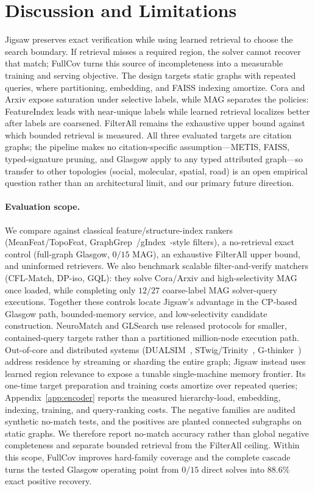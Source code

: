 \documentclass{article}
\begin{document}
\section{Discussion and Limitations}
\label{sec:limits}

Jigsaw preserves exact verification while using learned retrieval to choose the search boundary. If retrieval misses a required region, the solver cannot recover that match; FullCov turns this source of incompleteness into a measurable training and serving objective. The design targets static graphs with repeated queries, where partitioning, embedding, and FAISS indexing amortize. Cora and Arxiv expose saturation under selective labels, while MAG separates the policies: FeatureIndex leads with near-unique labels while learned retrieval localizes better after labels are coarsened. FilterAll remains the exhaustive upper bound against which bounded retrieval is measured. All three evaluated targets are citation graphs; the pipeline makes no citation-specific assumption---METIS, FAISS, typed-signature pruning, and Glasgow apply to any typed attributed graph---so transfer to other topologies (social, molecular, spatial, road) is an open empirical question rather than an architectural limit, and our primary future direction.

\paragraph{Evaluation scope.} We compare against classical feature/structure-index rankers (MeanFeat/TopoFeat, GraphGrep~\cite{ref_graphgrep}/gIndex~\cite{ref_gindex}-style filters), a no-retrieval exact control (full-graph Glasgow, $0/15$ MAG), an exhaustive FilterAll upper bound, and uninformed retrievers. We also benchmark scalable filter-and-verify matchers (CFL-Match, DP-iso, GQL): they solve Cora/Arxiv and high-selectivity MAG once loaded, while completing only $12/27$ coarse-label MAG solver-query executions. Together these controls locate Jigsaw's advantage in the CP-based Glasgow path, bounded-memory service, and low-selectivity candidate construction. NeuroMatch and GLSearch use released protocols for smaller, contained-query targets rather than a partitioned million-node execution path. Out-of-core and distributed systems (DUALSIM~\cite{ref_dualsim}, STwig/Trinity~\cite{ref_trinity}, G-thinker~\cite{ref_gthinker}) address residence by streaming or sharding the entire graph; Jigsaw instead uses learned region relevance to expose a tunable single-machine memory frontier. Its one-time target preparation and training costs amortize over repeated queries; Appendix~\ref{app:encoder} reports the measured hierarchy-load, embedding, indexing, training, and query-ranking costs. The negative families are audited synthetic no-match tests, and the positives are planted connected subgraphs on static graphs. We therefore report no-match accuracy rather than global negative completeness and separate bounded retrieval from the FilterAll ceiling. Within this scope, FullCov improves hard-family coverage and the complete cascade turns the tested Glasgow operating point from $0/15$ direct solves into $88.6\%$ exact positive recovery.
\end{document}

